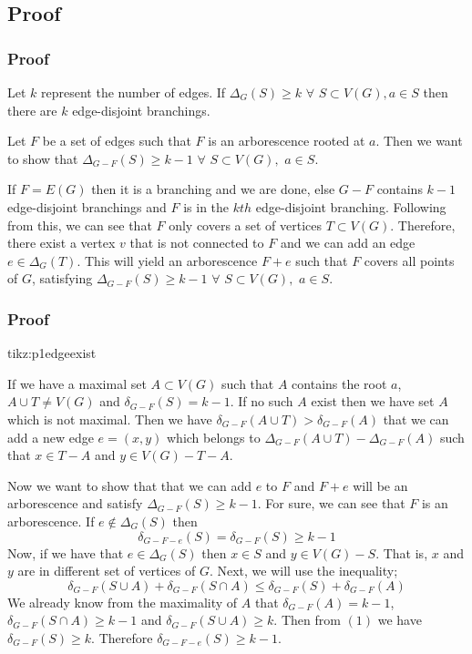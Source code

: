 \documentclass[8pt]{beamer}
\begin{document}
\subsection{Proof}
\begin{frame}
\frametitle{Proof}

Let $k$ represent the number of edges. If $\Delta_G(S) \ge k$ $\forall$ $S\subset V(G), a\in S$ then there are $k$ edge-disjoint branchings. 

Let $F$ be a set of edges such that $F$ is an arborescence rooted at $a$. Then we want to show that $\Delta_{G-F}(S) \ge k-1$ $\forall$ $S\subset V(G),$ $a\in S$.

If $F=E(G)$ then it is a branching and we are done, else $G-F$ contains $k-1$ edge-disjoint branchings and $F$ is in the $kth$ edge-disjoint branching. Following from this, we can see that $F$ only covers a set of vertices $T \subset V(G)$. Therefore, there exist a vertex $v$ that is not connected to $F$ and we can add an edge $e\in \Delta_G(T)$. This will yield an arborescence $F+e$ such that $F$ covers all points of $G$, satisfying $\Delta_{G-F}(S) \ge k-1$ $\forall$ $S\subset V(G),$ $a\in S$.
\end{frame}

\begin{frame}
\frametitle{Proof}
{}
{tikz:p1edgeexist}

If we have a maximal set $A\subset V(G)$ such that $A$ contains the root $a$, $A \cup T \ne V(G)$ and $\delta_{G-F}(S) = k-1$. If no such $A$ exist then we have set $A$ which is not maximal. Then we have $\delta_{G-F}(A\cup T) > \delta_{G-F}(A)$ that we can add a new edge $e=(x,y)$ which belongs to $\Delta_{G-F}(A\cup T) - \Delta_{G-F}(A)$ such that $x\in T-A$ and $y\in V(G) -T-A$.
\end{frame}

\begin{frame}
Now we want to show that that we can add $e$ to $F$ and $F+e$ will be an arborescence and satisfy $\Delta_{G-F}(S) \ge k-1$. For sure, we can see that $F$ is an arborescence. If $e\not\in \Delta_G(S)$ then $$\delta_{G-F-e}(S) = \delta_{G-F}(S) \ge k-1$$
Now, if we have that $e\in \Delta_G(S)$ then $x\in S$ and $y\in V(G)-S$. That is, $x$ and $y$ are in different set of vertices of $G$. Next, we will use the inequality; 
\begin{equation}\delta_{G-F}(S\cup A) + \delta_{G-F}(S\cap A) \le \delta_{G-F}(S) + \delta_{G-F}(A)\end{equation}
We already know from the maximality of $A$ that $\delta_{G-F}(A)=k-1$, $\delta_{G-F}(S\cap A) \ge k-1$ and $\delta_{G-F}(S\cup A) \ge k$. Then from $(1)$ we have $\delta_{G-F}(S) \ge k$. Therefore $\delta_{G-F-e}(S) \ge k-1$. 
\eofproof
\end{frame}
\end{document}
